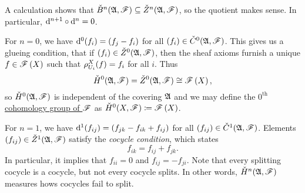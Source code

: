 \documentclass[../Moduli_Spaces_of_Riemann_Surfaces.tex]{subfiles}
\begin{document}
    \vspace{-0.05in}
    \begin{remark}
        A calculation shows that $\check{B}^n\!\left(\mathfrak{A},\mathscr{F}\right)\subseteq\check{Z}^n\!\left(\mathfrak{A},\mathscr{F}\right)$, so the quotient makes sense. In particular, $\mathrm{d}^{n+1}\circ\mathrm{d}^n=0$.\exqed
    \end{remark}
    \begin{remark}
        For $n=0$, we have $\mathrm{d}^0\!\left(f_i\right)=\left(f_j-f_i\right)$ for all $\left(f_i\right)\in\check{C}^0\!\left(\mathfrak{A},\mathscr{F}\right)$. This gives us a glueing condition, that if $\left(f_i\right)\in\check{Z}^0\!\left(\mathfrak{A},\mathscr{F}\right)$, then the sheaf axioms furnish a unique $f\in\mathscr{F}\left(X\right)$ such that $\rho^X_{U_i}\!\left(f\right)=f_i$ for all $i$. Thus
        \begin{equation*}
            \check{H}^0\!\left(\mathfrak{A},\mathscr{F}\right)=\check{Z}^0\!\left(\mathfrak{A},\mathscr{F}\right)\cong\mathscr{F}\left(X\right),
        \end{equation*}
        so $\check{H}^0\!\left(\mathfrak{A},\mathscr{F}\right)$ is independent of the covering $\mathfrak{A}$ and we may define the \ul{$0^\textrm{th}$ cohomology group of $\mathscr{F}$} as $\check{H}^0\!\left(X,\mathscr{F}\right)\coloneqq\mathscr{F}\left(X\right)$.\exqed
    \end{remark}
    \begin{remark}
        For $n=1$, we have $\mathrm{d}^1\!\left(f_{ij}\right)=\left(f_{jk}-f_{ik}+f_{ij}\right)$ for all $\left(f_{ij}\right)\in\check{C}^1\!\left(\mathfrak{A},\mathscr{F}\right)$. Elements $\left(f_{ij}\right)\in\check{Z}^1\!\left(\mathfrak{A},\mathscr{F}\right)$ satisfy the \textit{cocycle condition}, which states
        \begin{equation*}
            f_{ik}=f_{ij}+f_{jk}.
        \end{equation*}
        In particular, it implies that $f_{ii}=0$ and $f_{ij}=-f_{ji}$. Note that every splitting cocycle is a cocycle, but not every cocycle splits. In other words, $\check{H}^n\!\left(\mathfrak{A},\mathscr{F}\right)$ measures hows cocycles fail to split.\exqed
    \end{remark}
\end{document}
